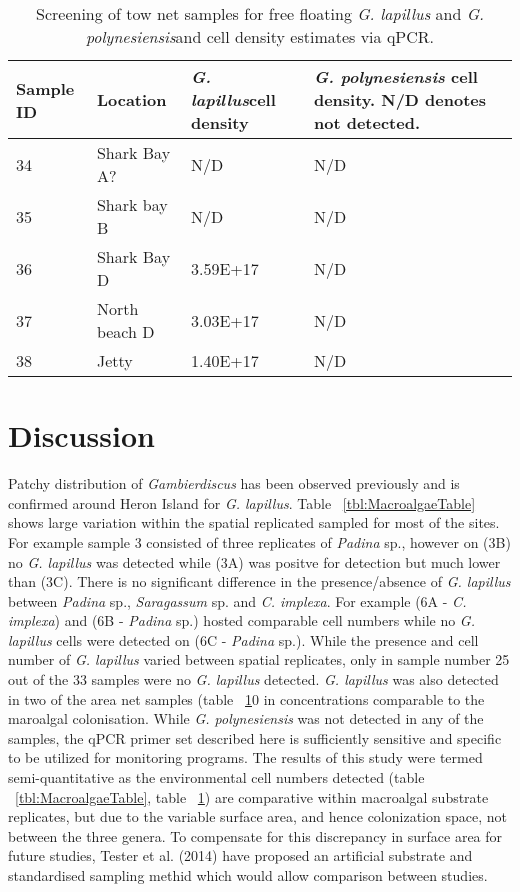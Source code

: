 \documentclass[12pt]{article}
\begin{document}
\FloatBarrier
\FloatBarrier
\begin{table}
\caption{Screening of tow net samples for free floating \emph{G. lapillus} and \emph{G. polynesiensis}and cell density estimates via qPCR.}
\label{tbl:NetTable}
\begin{tabular}{ | p{4cm} | p{4cm} |p{4cm} | p{4cm} | }
\hline
\textbf{Sample ID}&\textbf{Location}&\textbf{\emph{G. lapillus}cell density}&\textbf{\emph{G. polynesiensis} cell density. N/D denotes not detected.}\\
\hline
34&Shark Bay A?&N/D&N/D\\
\hline
35&Shark bay B&N/D&N/D\\
\hline
36&Shark Bay D&3.59E+17
&N/D\\
\hline
37&North beach D&3.03E+17
&N/D\\
\hline
38&Jetty&1.40E+17
&N/D\\
\hline
\end{tabular}
\end{table}
\FloatBarrier
\newpage
\section{Discussion}

Patchy distribution of \emph{Gambierdiscus} has been observed previously and is confirmed around Heron Island for \emph{G. lapillus}. Table ~\ref{tbl:MacroalgaeTable} shows large variation within the spatial replicated sampled for most of the sites. For example sample 3 consisted of three replicates of \emph{Padina} sp., however on (3B) no \emph{G. lapillus} was detected while (3A) was positve for detection but much lower than (3C).
There is no significant difference in the presence/absence of \emph{G. lapillus} between \emph{Padina} sp., \emph{Saragassum} sp. and \emph{C. implexa}. For example (6A - \emph{C. implexa}) and (6B - \emph{Padina} sp.) hosted comparable cell numbers while no \emph{G. lapillus} cells were detected on (6C - \emph{Padina} sp.). While the presence and cell number of \emph{G. lapillus} varied between spatial replicates, only in sample number 25 out of the 33 samples were no \emph{G. lapillus} detected. \emph{G. lapillus} was also detected in two of the area net samples (table ~\ref{tbl:NetTable}0 in concentrations comparable to the maroalgal colonisation.
While \emph{G. polynesiensis} was not detected in any of the samples, the qPCR primer set described here is sufficiently sensitive and specific to be utilized for monitoring programs.
The results of this study were termed semi-quantitative as the environmental cell numbers detected (table ~\ref{tbl:MacroalgaeTable}, table ~\ref{tbl:NetTable}) are comparative within macroalgal substrate replicates, but due to the variable surface area, and hence colonization space, not between the three genera. To compensate for this discrepancy in surface area for future studies, Tester et al. (2014) have proposed an artificial substrate and standardised sampling methid which would allow comparison between studies.
\end{document}
